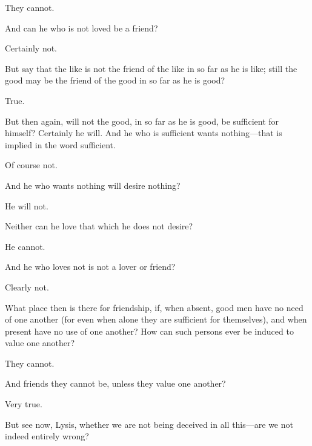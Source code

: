 \documentclass[11pt,letter]{article}
\begin{document}
\par  They cannot.

\par  And can he who is not loved be a friend?

\par  Certainly not.

\par  But say that the like is not the friend of the like in so far as he is like; still the good may be the friend of the good in so far as he is good?

\par  True.

\par  But then again, will not the good, in so far as he is good, be sufficient for himself? Certainly he will. And he who is sufficient wants nothing—that is implied in the word sufficient.

\par  Of course not.

\par  And he who wants nothing will desire nothing?

\par  He will not.

\par  Neither can he love that which he does not desire?

\par  He cannot.

\par  And he who loves not is not a lover or friend?

\par  Clearly not.

\par  What place then is there for friendship, if, when absent, good men have no need of one another (for even when alone they are sufficient for themselves), and when present have no use of one another? How can such persons ever be induced to value one another?

\par  They cannot.

\par  And friends they cannot be, unless they value one another?

\par  Very true.

\par  But see now, Lysis, whether we are not being deceived in all this—are we not indeed entirely wrong?
\end{document}
